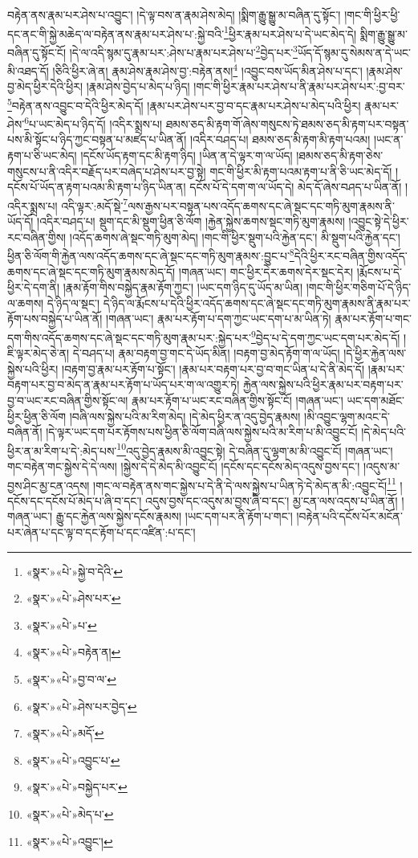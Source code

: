 བརྟེན་ནས་རྣམ་པར་ཤེས་པ་འབྱུང་། །དེ་ལྟ་བས་ན་རྣམ་ཤེས་མེད། །སྨིག་རྒྱུ་སྒྱུ་མ་བཞིན་དུ་སྟོང་། །གང་གི་ཕྱིར་ཕྱི་དང་ནང་གི་སྐྱེ་མཆེད་ལ་བརྟེན་ནས་རྣམ་པར་ཤེས་པ་:སྐྱེ་བའི་\footnote{«སྣར་»«པེ་»སྐྱེ་བ་དེའི་}ཕྱིར་རྣམ་པར་ཤེས་པ་དེ་ཡང་མེད་དེ། སྨིག་རྒྱུ་སྒྱུ་མ་བཞིན་དུ་སྟོང་ངོ། །དེ་ལ་འདི་སྙམ་དུ་རྣམ་པར་:ཤེས་པ་རྣམ་པར་ཤེས་པ་\footnote{«སྣར་»«པེ་»ཤེས་པར་}བྱེད་པར་\footnote{«སྣར་»«པེ་»པ་}ཡོད་དོ་སྙམ་དུ་སེམས་ན་དེ་ཡང་མི་འཐད་དོ། །ཅིའི་ཕྱིར་ཞེ་ན། རྣམ་ཤེས་རྣམ་ཤེས་བྱ་:བརྟེན་ནས།\footnote{«སྣར་»«པེ་»བརྟེན་ན།} །འབྱུང་བས་ཡོད་མིན་ཤེས་པ་དང་། །རྣམ་ཤེས་བྱ་མེད་ཕྱིར་དེའི་ཕྱིར། །རྣམ་ཤེས་བྱེད་པ་མེད་པ་ཉིད། །གང་གི་ཕྱིར་རྣམ་པར་ཤེས་པ་ནི་རྣམ་པར་ཤེས་པར་:བྱ་བར་\footnote{«སྣར་»«པེ་»བྱ་བ་ལ་}བརྟེན་ནས་འབྱུང་བ་དེའི་ཕྱིར་མེད་དོ། །རྣམ་པར་ཤེས་པར་བྱ་བ་དང་རྣམ་པར་ཤེས་པ་མེད་པའི་ཕྱིར། རྣམ་པར་ཤེས་\footnote{«སྣར་»«པེ་»ཤེས་པར་བྱེད་}པ་ཡང་མེད་པ་ཉིད་དོ། །འདིར་སྨྲས་པ། ཐམས་ཅད་མི་རྟག་གོ་ཞེས་གསུངས་ཏེ་ཐམས་ཅད་མི་རྟག་པར་བསྟན་པས་མི་སྟོང་པ་ཉིད་ཀྱང་བསྟན་པ་མཛད་པ་ཡིན་ནོ། །འདིར་བཤད་པ། ཐམས་ཅད་མི་རྟག་མི་རྟག་པའམ། །ཡང་ན་རྟག་པ་ཅི་ཡང་མེད། །དངོས་ཡོད་རྟག་དང་མི་རྟག་ཉིད། །ཡིན་ན་དེ་ལྟར་ག་ལ་ཡོད། །ཐམས་ཅད་མི་རྟག་ཅེས་གསུངས་པ་ནི་འདིར་བརྗོད་པར་བཞེད་པ་ཤེས་པར་བྱ་སྟེ། གང་གི་ཕྱིར་མི་རྟག་པའམ་རྟག་པ་ནི་ཅི་ཡང་མེད་དོ། །དངོས་པོ་ཡོད་ན་རྟག་པའམ་མི་རྟག་པ་ཉིད་ཡིན་ན། དངོས་པོ་དེ་དག་ག་ལ་ཡོད་དེ། མེད་དོ་ཞེས་བཤད་པ་ཡིན་ནོ། །འདིར་སྨྲས་པ། འདི་ལྟར་:མདོ་སྡེ་\footnote{«སྣར་»«པེ་»མདོ་}ལས་རྒྱས་པར་བསྟན་པས་འདོད་ཆགས་དང་ཞེ་སྡང་དང་གཏི་མུག་རྣམས་ནི་ཡོད་དོ། །འདིར་བཤད་པ། སྡུག་དང་མི་སྡུག་ཕྱིན་ཅི་ལོག །རྐྱེན་སྐྱེས་ཆགས་སྡང་གཏི་མུག་རྣམས། །འབྱུང་སྟེ་དེ་ཕྱིར་རང་བཞིན་གྱིས། །འདོད་ཆགས་ཞེ་སྡང་གཏི་མུག་མེད། །གང་གི་ཕྱིར་སྡུག་པའི་རྐྱེན་དང་། མི་སྡུག་པའི་རྐྱེན་དང་། ཕྱིན་ཅི་ལོག་གི་རྐྱེན་ལས་འདོད་ཆགས་དང་ཞེ་སྡང་དང་གཏི་མུག་རྣམས་:བྱུང་པ་\footnote{«སྣར་»«པེ་»འབྱུང་པ་}དེའི་ཕྱིར་རང་བཞིན་གྱིས་འདོད་ཆགས་དང་ཞེ་སྡང་དང་གཏི་མུག་རྣམས་མེད་དོ། །གཞན་ཡང་། གང་ཕྱིར་དེར་ཆགས་དེར་སྡང་དེར། །རྨོངས་པ་དེ་ཕྱིར་དེ་དག་ནི། །རྣམ་རྟོག་གིས་བསྐྱེད་རྣམ་རྟོག་ཀྱང་། །ཡང་དག་ཉིད་དུ་ཡོད་མ་ཡིན། །གང་གི་ཕྱིར་གཅིག་པོ་དེ་ཉིད་ལ་ཆགས། དེ་ཉིད་ལ་སྡང་། དེ་ཉིད་ལ་རྨོངས་པ་དེའི་ཕྱིར་འདོད་ཆགས་དང་ཞེ་སྡང་དང་གཏི་མུག་རྣམས་ནི་རྣམ་པར་རྟོག་པས་བསྐྱེད་པ་ཡིན་ནོ། །གཞན་ཡང་། རྣམ་པར་རྟོག་པ་དག་ཀྱང་ཡང་དག་པ་མ་ཡིན་ཏེ། རྣམ་པར་རྟོག་པ་གང་དག་གིས་འདོད་ཆགས་དང་ཞེ་སྡང་དང་གཏི་མུག་རྣམ་པར་:སྐྱེད་པར་\footnote{«སྣར་»«པེ་»བསྐྱེད་པར་}བྱེད་པ་དེ་དག་ཀྱང་ཡང་དག་པར་མེད་དོ། །ཇི་ལྟར་མེད་ཅེ་ན། དེ་བཤད་པ། རྣམ་བརྟག་བྱ་གང་དེ་ཡོད་མིན། །བརྟག་བྱ་མེད་རྟོག་ག་ལ་ཡོད། །དེ་ཕྱིར་རྐྱེན་ལས་སྐྱེས་པའི་ཕྱིར། །བརྟག་བྱ་རྣམ་པར་རྟོག་པ་སྟོང་། །རྣམ་པར་བརྟག་པར་བྱ་བ་གང་ཡིན་པ་དེ་ནི་མེད་དོ། །རྣམ་པར་བརྟག་པར་བྱ་བ་མེད་ན་རྣམ་པར་རྟོག་པ་ཡོད་པར་ག་ལ་འགྱུར་ཏེ། རྐྱེན་ལས་སྐྱེས་པའི་ཕྱིར་རྣམ་པར་བརྟག་པར་བྱ་བ་ཡང་རང་བཞིན་གྱིས་སྟོང་ལ། རྣམ་པར་རྟོག་པ་ཡང་རང་བཞིན་གྱིས་སྟོང་ངོ། །གཞན་ཡང་། ཡང་དག་མཐོང་ཕྱིར་ཕྱིན་ཅི་ལོག །བཞི་ལས་སྐྱེས་པའི་མ་རིག་མེད། །དེ་མེད་ཕྱིར་ན་འདུ་བྱེད་རྣམས། །མི་འབྱུང་ལྷག་མའང་དེ་བཞིན་ནོ། །དེ་ལྟར་ཡང་དག་པར་རྟོགས་པས་ཕྱིན་ཅི་ལོག་བཞི་ལས་སྐྱེས་པའི་མ་རིག་པ་མི་འབྱུང་ངོ། །དེ་མེད་པའི་ཕྱིར་ན་མ་རིག་པ་དེ་:མེད་པས་\footnote{«སྣར་»«པེ་»མེད་པ་}འདུ་བྱེད་རྣམས་མི་འབྱུང་སྟེ། དེ་བཞིན་དུ་ལྷག་མ་མི་འབྱུང་ངོ། །གཞན་ཡང་། གང་བརྟེན་གང་སྐྱེས་དེ་དེ་ལས། །སྐྱེས་དེ་དེ་མེད་མི་འབྱུང་ངོ། །དངོས་དང་དངོས་མེད་འདུས་བྱས་དང་། །འདུས་མ་བྱས་ཤིང་མྱ་ངན་འདས། །གང་ལ་བརྟེན་ནས་གང་སྐྱེས་པ་དེ་ནི་དེ་ལས་སྐྱེས་པ་ཡིན་ཏེ་དེ་མེད་ན་མི་:འབྱུང་ངོ།\footnote{«སྣར་»«པེ་»འབྱུང་།} །དངོས་དང་དངོས་པོ་མེད་པ་ཞི་བ་དང་། འདུས་བྱས་དང་འདུས་མ་བྱས་ཞི་བ་དང་། མྱ་ངན་ལས་འདས་པ་ཡིན་ནོ། །གཞན་ཡང་། རྒྱུ་དང་རྐྱེན་ལས་སྐྱེས་དངོས་རྣམས། །ཡང་དག་པར་ནི་རྟོག་པ་གང་། །བརྟེན་པའི་དངོས་པོར་མངོན་པར་ཞེན་པ་དང་ལྟ་བ་དང་རྟོག་པ་དང་འཛིན་:པ་དང་། 